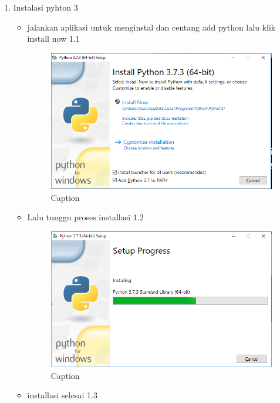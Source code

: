 \begin{enumerate}
\item Instalasi pyhton 3
\begin{itemize}
    \item jalankan aplikasi untuk menginstal dan centang add python lalu klik install now 1.1
    \begin{figure}
        \centering
        \includegraphics[scale=0.5]{figures/1.PNG}
        \caption{Caption}
        \label{fig:my_label}
    \end{figure}
    \item Lalu tunggu proses installasi 1.2
    \begin{figure}
        \centering
        \includegraphics[scale=0.5]{figures/2.PNG}
        \caption{Caption}
        \label{fig:my_label}
    \end{figure}
    \item installasi selesai 1.3
    \begin{figure}
        \centering

\end{figure}
\end{itemize}
\end{enumerate}
